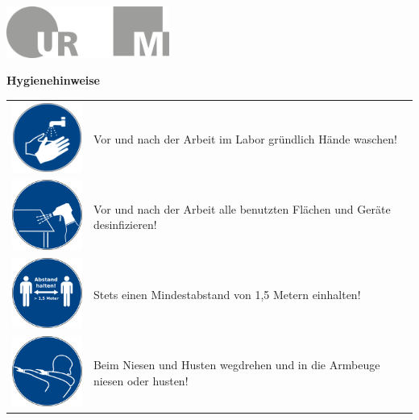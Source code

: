 \documentclass[24pt, a4paper, portrait]{article}
\begin{document}
\pagestyle{empty}

\raggedleft

\includegraphics[width=0.4\textwidth]{logo}

\vspace{1cm}
\sffamily
\centering
\Huge

\textbf{Hygienehinweise}


\raggedright
\huge

\begin{tabular}{ m{3.7cm} m{12.5cm} }
    \includegraphics[width=3cm]{handhygiene} & Vor und nach der Arbeit im Labor gründlich Hände waschen! \\
    \vspace{2mm}
    \includegraphics[width=3cm]{desinfektion} & Vor und nach der Arbeit alle benutzten Flächen und Geräte desinfizieren! \\
    \vspace{2mm}
    \includegraphics[width=3cm]{abstand} & Stets einen Mindestabstand von 1,5 Metern einhalten! \\
    \vspace{2mm}
    \includegraphics[width=3cm]{niesetikette} & Beim Niesen und Husten wegdrehen und in die Armbeuge niesen oder husten! \\

\end{tabular}
\end{document}
